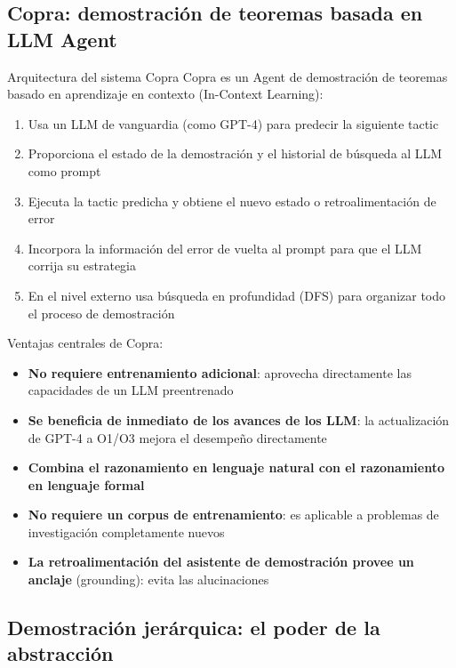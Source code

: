 \documentclass[a4paper]{article}
\begin{document}
\subsection{Copra: demostración de teoremas basada en LLM Agent}

\begin{importantbox}{Arquitectura del sistema Copra}
Copra es un Agent de demostración de teoremas basado en aprendizaje en contexto (In-Context Learning):
\begin{enumerate}
    \item Usa un LLM de vanguardia (como GPT-4) para predecir la siguiente tactic
    \item Proporciona el estado de la demostración y el historial de búsqueda al LLM como prompt
    \item Ejecuta la tactic predicha y obtiene el nuevo estado o retroalimentación de error
    \item Incorpora la información del error de vuelta al prompt para que el LLM corrija su estrategia
    \item En el nivel externo usa búsqueda en profundidad (DFS) para organizar todo el proceso de demostración
\end{enumerate}
\end{importantbox}

Ventajas centrales de Copra:
\begin{itemize}
    \item \textbf{No requiere entrenamiento adicional}: aprovecha directamente las capacidades de un LLM preentrenado
    \item \textbf{Se beneficia de inmediato de los avances de los LLM}: la actualización de GPT-4 a O1/O3 mejora el desempeño directamente
    \item \textbf{Combina el razonamiento en lenguaje natural con el razonamiento en lenguaje formal}
    \item \textbf{No requiere un corpus de entrenamiento}: es aplicable a problemas de investigación completamente nuevos
    \item \textbf{La retroalimentación del asistente de demostración provee un anclaje} (grounding): evita las alucinaciones
\end{itemize}

\subsection{Demostración jerárquica: el poder de la abstracción}
\end{document}
